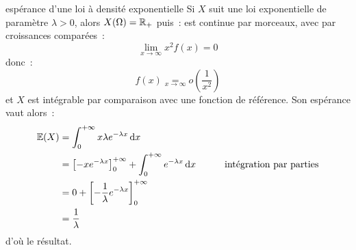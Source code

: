 \begin{exemple}{}{espérance d'une loi à densité exponentielle}
    Si $X$ suit une loi exponentielle de paramètre $\lambda > 0$, alors $X(\Omega) = \mathbb{R}_+$ puis~:
    est continue par morceaux, avec par croissances comparées~:
    $$\lim_{x \to \infty} x^2 f(x) = 0$$
    donc~:
    $$f(x) \underset{x \to \infty}{=} o\left(\frac{1}{x^2}\right)$$
    et $X$ est intégrable par comparaison avec une fonction de référence. Son espérance vaut alors~:
    \begin{align*}
        \mathbb{E}(X) &= \int_0^{+\infty} x \lambda e^{-\lambda x}\,\mathrm{d}x\\
        &= \left[-xe^{-\lambda x}\right]_0^{+\infty} + \int_0^{+\infty} e^{-\lambda x}\,\mathrm{d}x \qquad &\text{intégration par parties}\\
        &= 0 + \left[-\frac{1}{\lambda}e^{-\lambda x}\right]_0^{+\infty}\\
        &= \frac{1}{\lambda}
    \end{align*}
    d'où le résultat.
\end{exemple}

